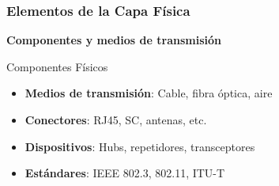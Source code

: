 \documentclass[aspectratio=169]{beamer}
\begin{document}
            \begin{frame}
            \frametitle{Elementos de la Capa Física}
            
            \begin{center}
            \Large \textbf{Componentes y medios de transmisión}
            \end{center}
            
            \begin{block}{Componentes Físicos}
            \begin{itemize}
            \item \textbf{Medios de transmisión}: Cable, fibra óptica, aire
            \item \textbf{Conectores}: RJ45, SC, antenas, etc.
            \item \textbf{Dispositivos}: Hubs, repetidores, transceptores
            \item \textbf{Estándares}: IEEE 802.3, 802.11, ITU-T
            \end{itemize}
            \end{block}
            \end{frame}
            
\end{document}
